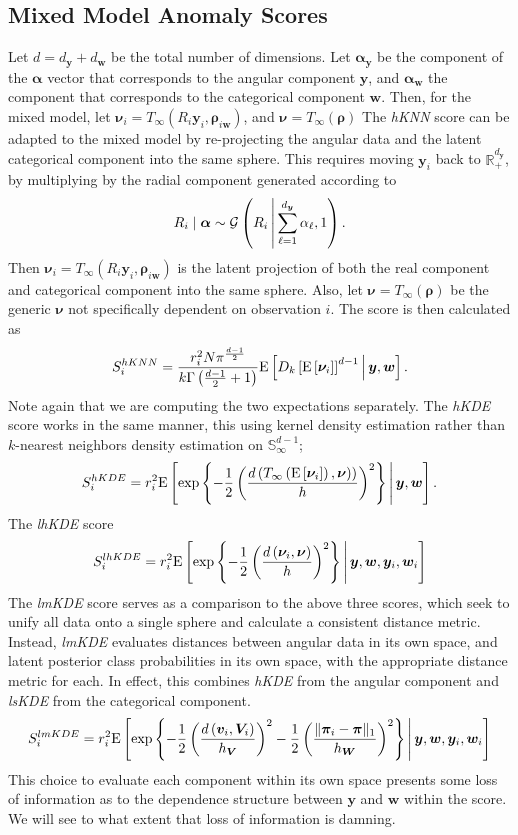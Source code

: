 \subsection{Mixed Model Anomaly Scores\label{sec:mixedscores}}
Let $d = d_{\bm{y}} + d_{\bm{w}}$ be the total number of dimensions.  
Let $\bm{\alpha}_{\bm{y}}$ be the component of the $\bm{\alpha}$ vector that corresponds 
to the angular component $\bm{y}$, and $\bm{\alpha}_{\bm{w}}$ the component that 
corresponds to the categorical component $\bm{w}$.
Then, for the mixed model, let $\bm{\nu}_i = T_{\infty}(R_i\bm{y}_i, \bm{\rho}_{i\bm{w}})$, and $\bm{\nu} = T_{\infty}(\bm{\rho})$
The \emph{hKNN} score can be adapted to the mixed model by re-projecting the angular data and the latent categorical component into the same sphere. This requires moving $\bm{y}_i$ back to $\mathbb{R}_+^{d_{\bm{y}}}$,
by multiplying by the radial component generated according to
\[
    R_i\mid\bm{\alpha} \sim \mathcal{G}\left(R_i\,\middle\vert\,\sum_{\ell = 1}^{d_{\bm{y}}}\alpha_{\ell}, 1\right).
\]
Then $\bm{\nu}_i = T_{\infty}(R_i\bm{y}_i, \bm{\rho}_{i\bm{w}})$ is the latent projection of both the real component and categorical component into the same sphere.  Also, let $\bm{\nu} = T_{\infty}(\bm{\rho})$ be
the generic $\bm{\nu}$ not specifically dependent on observation $i$.  The score is then calculated as
\[
S_i^{hKNN} = \frac{r_i^2 N\pi^{\frac{d-1}{2}}}{k\Gamma\left(\frac{d-1}{2} + 1\right)}
\text{E}\left[D_{k}\left[\text{E}\left[\bm{\nu}_i\right]\right]^{d-1}\,\middle\vert\,\bm{y},\bm{w}\right].
\]
Note again that we are computing the two expectations separately.  The \emph{hKDE} score works in
the same manner, this using kernel density estimation rather than $k$-nearest neighbors density estimation
on $\mathbb{S}_{\infty}^{d-1}$;
\[
S_i^{hKDE} = r_i^2 \text{E}\left[\exp\left\lbrace -\frac{1}{2}
    \left(
    \frac{d\left(T_{\infty}\left(\text{E}\left[\bm{\nu}_i\right]\right), \bm{\nu})\right)}{h}
    \right)^2
    \right\rbrace \,\middle\vert\, \bm{y},\bm{w}
    \right].
\]
The \emph{lhKDE} score 
\[
S_i^{lhKDE} = r_i^2 \text{E}\left[\exp\left\lbrace-\frac{1}{2}\left(
    \frac{d\left(\bm{\nu}_i, \bm{\nu}\right)}{h}\right)^2\right\rbrace\,\middle\vert\, \bm{y},\bm{w},\bm{y}_i,\bm{w}_i\right]
\]
The \emph{lmKDE} score serves as a comparison to the above three scores, which seek to unify all data 
onto a single sphere and calculate a consistent distance metric.  Instead, \emph{lmKDE} evaluates 
distances between angular data in its own space, and latent posterior class probabilities in its 
own space, with the appropriate distance metric for each.  In effect, this combines \emph{hKDE} from
the angular component and \emph{lsKDE} from the categorical component.
\[
S_i^{lmKDE} = r_i^2 \text{E}\left[
\exp
\left\lbrace 
-\frac{1}{2}
\left(
\frac{d\left(\bm{v}_i, \bm{V}_i\right)}{h_{\bm{V}}}
\right)^2
-\frac{1}{2}
\left(
\frac{\lVert\bm{\pi}_i - \bm{\pi}\rVert_1}{h_{\bm{W}}}
\right)^2
\right\rbrace
\,\middle\vert\, \bm{y},\bm{w},\bm{y}_i,\bm{w}_i\right]
\]
This choice to evaluate each component within its own space presents some loss of 
    information as to the dependence structure between $\bm{y}$ and $\bm{w}$ within 
    the score.  We will see to what extent that loss of information is damning.

